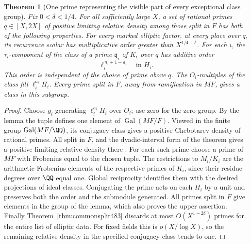 \documentclass[a4paper,11pt]{article}
\newtheorem{theorem}[proposition]{Theorem}
\theoremstyle{definition}
\theoremstyle{remark}
\numberwithin{equation}{section}
\begin{document}
\begin{theorem}[One prime representing the visible part of every exceptional class group]\leavevmode
\label{thm:classfrob503}
Fix \(0<\delta<1/4\). For all sufficiently large \(X\), a set
of rational primes \(q\in[X,2X]\) of positive limiting relative
density among those split in \(F\) has both of the following
properties. For every marked elliptic factor, at every place
over \(q\), its recurrence scalar has multiplicative order
greater than \(X^{1/4-\delta}\). For each \(i\), the
\(\tau_i\)-component of the class of a prime \(\mathfrak q_i\)
of \(K_i\) over \(q\) has additive order
\[
                  \ell_i^{\,n_i+1-a_i}\quad\text{in }H_i .
\]
This order is independent of the choice of prime above \(q\).
The \(O_i\)-multiples of the class fill
\(\ell_i^{a_i}H_i\). Every prime split in \(F\), away from
ramification in \(MF\), gives a class in this subgroup.
\end{theorem}
\begin{proof}
Choose \(g_i\) generating \(\ell_i^{a_i}H_i\) over \(O_i\);
use zero for the zero group. By the lemma the tuple defines one
element of \(\operatorname{Gal}(MF/F)\). Viewed in the finite
group \(\operatorname{Gal}(MF/\QQ)\), its conjugacy class gives
a positive Chebotarev density of rational primes. All split in
\(F\), and the dyadic-interval form of the theorem gives a
positive limiting relative density there
\cite[\S1A]{XI-VIII-I-tz50}. For each such prime choose a prime of
\(MF\) with Frobenius equal to the chosen tuple. The restrictions
to \(M_i/K_i\) are the arithmetic Frobenius elements of the
respective primes of \(K_i\), since their residue degrees over
\(\QQ\) equal one. Global reciprocity identifies them with the
desired projections of ideal classes. Conjugating the prime acts
on each \(H_i\) by a unit and preserves both the order and the
submodule generated. All primes split in \(F\) give elements in
the group of the lemma, which also proves the upper assertion.
Finally Theorem~\ref{thm:commonsplit483} discards at most
\(O(X^{1-2\delta})\) primes for the entire list of elliptic data.
For fixed fields this is \(o(X/\log X)\), so the remaining
relative density in the specified conjugacy class tends to one.
\end{proof}
\end{document}
